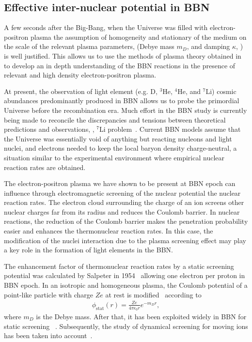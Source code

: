 \subsection{Effective inter-nuclear potential in BBN}\label{sec:potential}

A few seconds after the Big-Bang, when the Universe was filled with electron-positron plasma the assumption of homogeneity and stationary of the medium on the scale of the relevant plasma parameters, (Debye mass $m_D$, and damping $\kappa$, ) is well justified. This allows us to use the methods of plasma theory obtained in  to develop an in depth understanding of the BBN reactions in the presence of relevant and high density electron-positron plasma.

At present, the observation of light element 
(e.g. D, $^3$He, $^4$He, and $^7$Li) cosmic abundances predominantly produced in BBN allows us to probe the primordial Universe before the recombination era. Much effort in the BBN study is currently being made to reconcile the discrepancies and tensions between theoretical predictions and observations, \eg, $^7$Li problem~\cite{Pitrou:2018cgg}. Current BBN models assume that the Universe was essentially void of anything but reacting nucleons and light nuclei, and electrons needed to keep the local baryon density charge-neutral, a situation similar to the experimental environment where empirical nuclear reaction rates are obtained.

The electron-positron plasma we have shown to be present at BBN epoch can influence through electromagnetic screening of the nuclear potential the nuclear reaction rates. The electron cloud surrounding the charge of an ion screens other nuclear charges far from its radius and reduces the Coulomb barrier. In nuclear reactions, the reduction of the Coulomb barrier makes the penetration probability easier and enhances the thermonuclear reaction rates. In this case, the modification of the nuclei interaction due to the plasma screening effect may play a key role in the formation of light elements in the BBN. 

The enhancement factor of thermonuclear reaction rates by a static screening potential was calculated by Salpeter in 1954~\cite{Salpeter:1954nc} allowing one electron per proton in BBN epoch. In an isotropic and homogeneous plasma, the Coulomb potential of a point-like particle with charge $Ze$ at rest is modified~\cite{Salpeter:1954nc} according to 
\begin{align}
\phi_\text{stat}(r)=\frac{Ze}{4\pi\epsilon_0 r}e^{-m_Dr},
\end{align}
where $m_D$ is the Debye mass. After that, it has been exploited widely in BBN for static screening ~\cite{1969ApJ...155..183S,Famiano:2016hhs}. Subsequently, the study of dynamical screening for moving ions has been taken into account~\cite{Carraro:1988apj,Gruzinov:1997as,Hwang:2021kno}.  


